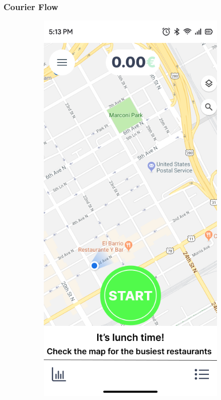 \documentclass[a4paper,twoside,11pt]{article}
\begin{document}
\newpage

\subsubsection{Courier Flow}

\begin{figure}[h]
    \centering
    \begin{subfigure}[b]{0.48\textwidth}
        \centering
        \includegraphics[width=\textwidth]{go_screen.png}

\end{subfigure}
\end{figure}
\end{document}
